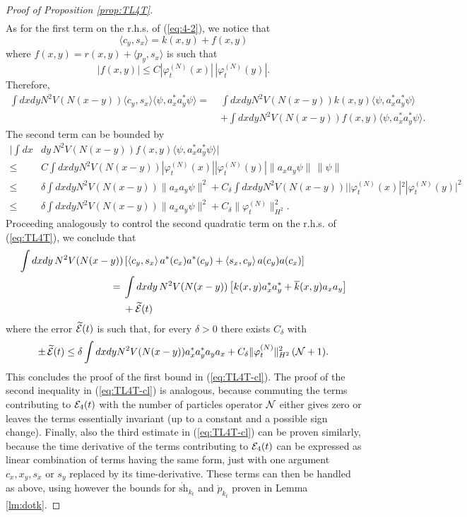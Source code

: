 \documentclass[11pt,a4paper]{article}
\newcommand{\wt}{\widetilde}
\newcommand{\cE}{{\cal E}}
\newcommand{\cN}{{\cal N}}
\begin{document}
\begin{proof}[Proof of Proposition \ref{prop:TL4T}]
\[\begin{split}
\end{split} \]
As for the first term on the r.h.s. of (\ref{eq:4-2}), we notice that 
\[ \langle c_y , s_x \rangle = k (x,y) + f(x,y) \]
where $f(x,y) = r(x,y) + \langle p_y , s_x \rangle$ is such that
\[ |f(x,y) | \leq C |\varphi_t^{(N)} (x)| \, | \varphi_t^{(N)} (y)|. \]
Therefore,
\[ \begin{split} 
\int dx dy N^2 V(N (x-y)) \langle c_y , s_x \rangle \langle \psi , a^*_x a^*_y \psi \rangle =\; & \int dx dy N^2 V(N (x-y)) k(x,y)  \langle \psi , a^*_x a^*_y \psi \rangle \\ &+ \int dx dy N^2 V(N (x-y)) f(x,y) \langle \psi , a^*_x a^*_y \psi \rangle.
\end{split} \]
The second term can be bounded by
\[ \begin{split} 
\Big| \int dx &dy  \, N^2 V(N (x-y)) f(x,y) \langle \psi , a^*_x a^*_y \psi \rangle \Big| \\  \leq \; &C \int dx dy N^2 V(N (x-y)) |\varphi_t^{(N)} (x)| |\varphi_t^{(N)} (y)| \|  a_x a_y \psi \| \, \| \psi \| \\ \leq \; &\delta \int dx dy N^2 V(N (x-y)) \| a_x a_y \psi \|^2 + C_\delta \int dx dy N^2 V(N(x-y)) | |\varphi_t^{(N)} (x)|^2 |\varphi_t^{(N)} (y)|^2  \\ \leq \; & \delta \int dx dy N^2 V(N(x-y)) \| a_x a_y \psi \|^2 + C_\delta \| \varphi_t^{(N)} \|_{H^2}^2.  \end{split} \]
Proceeding analogously to control the second quadratic term on the r.h.s. of (\ref{eq:TL4T}), we conclude that 
\[ \begin{split} 
\int dx dy \, N^2 V (N (x-y)) & \left[ \langle c_y, s_x \rangle \,  a^* (c_x) a^* (c_y)  + \langle s_x, c_y \rangle \, a (c_y)  a(c_x) \right] \\  = \; & \int dx dy \, N^2 V(N(x-y))  \left[ k(x,y) a^*_x a^*_y + \overline{k} (x,y) a_x a_y \right] \\ &+ \wt{\cE} (t) \end{split} \]
where the error $\wt{\cE} (t)$ is such that, for every $\delta >0$ there exists $C_\delta$ with 
\[ \pm \, \wt{\cE} (t) \leq  \delta \int dx dy N^2 V(N (x-y)) a_x^* a_y^* a_y a_x + C_\delta \| \varphi_t^{(N)}  \|_{H^2}^2 \,  (\cN + 1). \]
This concludes the proof of the first bound in (\ref{eq:TL4T-cl}).  The proof of the second inequality in (\ref{eq:TL4T-cl}) is analogous, because commuting the terms contributing to $\cE_4 (t)$ with the number of particles operator $\cN$ either gives zero or leaves the terms essentially invariant (up to a constant and a possible sign change). Finally, also the third estimate in (\ref{eq:TL4T-cl}) can be proven similarly, because the time derivative of the terms contributing to $\cE_4 (t)$ can be expressed as linear combination of terms having the same form, just with one argument $c_x,x_y,s_x$ or $s_y$ replaced by its time-derivative. These terms can then be handled as above, using however 
the bounds for $ \dot{\text{sh}}_{k_t}$ and $\dot{p}_{k_t}$ proven in Lemma \ref{lm:dotk}.
\end{proof}
\end{document}
